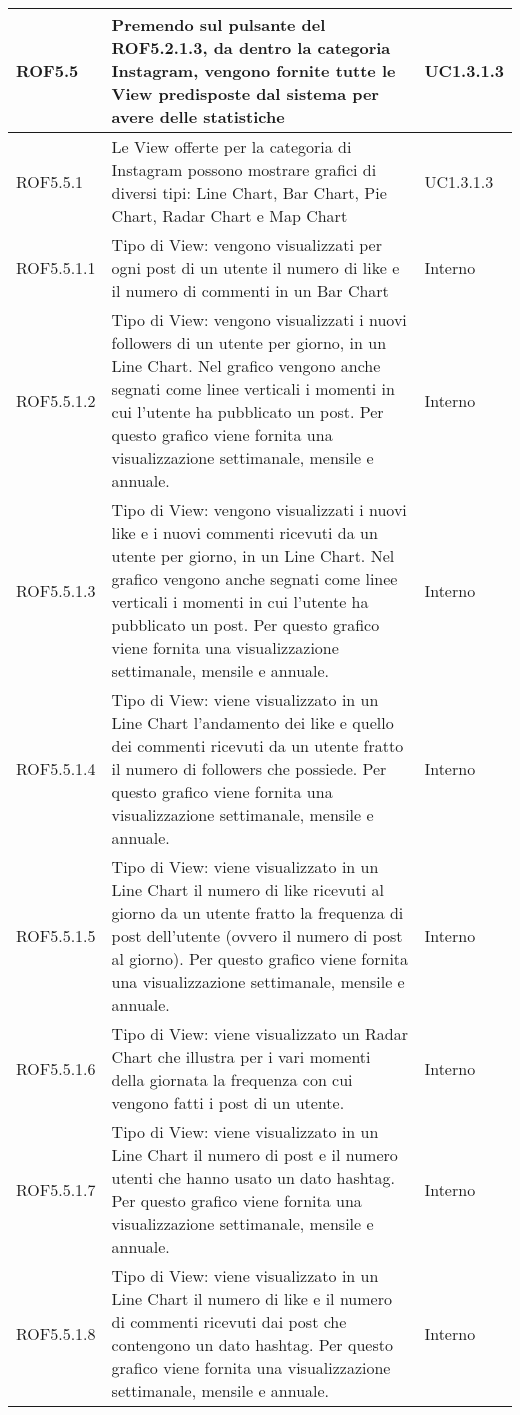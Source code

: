 \begin{center}
\begin{longtable}{| p{2.5cm} | p{8cm} | p{2cm} |}
		ROF5.5  &  Premendo sul pulsante del ROF5.2.1.3, da dentro la categoria Instagram, vengono fornite tutte le View predisposte dal sistema per avere delle statistiche &  UC1.3.1.3  \\
		\hline
		ROF5.5.1  & Le View offerte per la categoria di Instagram possono mostrare grafici di diversi tipi: Line Chart, Bar Chart, Pie Chart, Radar Chart e Map Chart  &  UC1.3.1.3 \\
		\hline
		ROF5.5.1.1  &  Tipo di View: vengono visualizzati per ogni post di un utente il numero di like e il numero di commenti in un Bar Chart & Interno \\
		\hline
		ROF5.5.1.2  &  Tipo di View: vengono visualizzati i nuovi followers di un utente per giorno, in un Line Chart. Nel grafico vengono anche segnati come linee verticali i momenti in cui l'utente ha pubblicato un post. Per questo grafico viene fornita una visualizzazione settimanale, mensile e annuale. & Interno \\
		\hline
		ROF5.5.1.3  &  Tipo di View: vengono visualizzati i nuovi like e i nuovi commenti ricevuti da un utente per giorno, in un Line Chart. Nel grafico vengono anche segnati come linee verticali i momenti in cui l'utente ha pubblicato un post. Per questo grafico viene fornita una visualizzazione settimanale, mensile e annuale. & Interno \\
		\hline
		ROF5.5.1.4  & Tipo di View: viene visualizzato in un Line Chart l'andamento dei like e quello dei commenti ricevuti da un utente fratto il numero di followers che possiede. Per questo grafico viene fornita una visualizzazione settimanale, mensile e annuale. & Interno \\
		\hline
		ROF5.5.1.5  &  Tipo di View: viene visualizzato in un Line Chart il numero di like ricevuti al giorno da un utente fratto la frequenza di post dell'utente (ovvero il numero di post al giorno). Per questo grafico viene fornita una visualizzazione settimanale, mensile e annuale. & Interno \\
		\hline
		ROF5.5.1.6  &  Tipo di View: viene visualizzato un Radar Chart che illustra per i vari momenti della giornata la frequenza con cui vengono fatti i post di un utente. & Interno \\
		\hline
		ROF5.5.1.7  &  Tipo di View: viene visualizzato in un Line Chart il numero di post e il numero utenti che hanno usato un dato hashtag. Per questo grafico viene fornita una visualizzazione settimanale, mensile e annuale. & Interno \\
		\hline
		ROF5.5.1.8  &  Tipo di View: viene visualizzato in un Line Chart il numero di like e il numero di commenti ricevuti dai post che contengono un dato hashtag. Per questo grafico viene fornita una visualizzazione settimanale, mensile e annuale. & Interno \\

\end{longtable}
\end{center}
